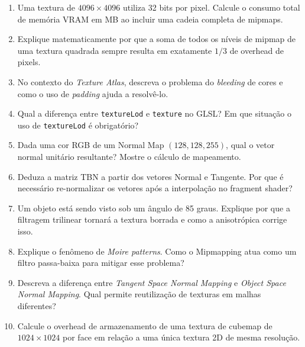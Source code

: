 \begin{enumerate}
    \item Uma textura de $4096 \times 4096$ utiliza 32 bits por pixel. Calcule o consumo total de memória VRAM em MB ao incluir uma cadeia completa de mipmaps.
    \item Explique matematicamente por que a soma de todos os níveis de mipmap de uma textura quadrada sempre resulta em exatamente $1/3$ de overhead de pixels.
    \item No contexto do \textit{Texture Atlas}, descreva o problema do \textit{bleeding} de cores e como o uso de \textit{padding} ajuda a resolvê-lo.
    \item Qual a diferença entre \texttt{textureLod} e \texttt{texture} no GLSL? Em que situação o uso de \texttt{textureLod} é obrigatório?
    \item Dada uma cor RGB de um Normal Map $(128, 128, 255)$, qual o vetor normal unitário resultante? Mostre o cálculo de mapeamento.
    \item Deduza a matriz TBN a partir dos vetores Normal e Tangente. Por que é necessário re-normalizar os vetores após a interpolação no fragment shader?
    \item Um objeto está sendo visto sob um ângulo de 85 graus. Explique por que a filtragem trilinear tornará a textura borrada e como a anisotrópica corrige isso.
    \item Explique o fenômeno de \textit{Moire patterns}. Como o Mipmapping atua como um filtro passa-baixa para mitigar esse problema?
    \item Descreva a diferença entre \textit{Tangent Space Normal Mapping} e \textit{Object Space Normal Mapping}. Qual permite reutilização de texturas em malhas diferentes?
    \item Calcule o overhead de armazenamento de uma textura de cubemap de $1024 \times 1024$ por face em relação a uma única textura 2D de mesma resolução.
\end{enumerate}
